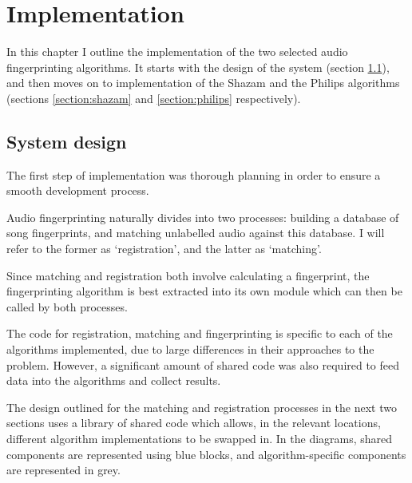 \documentclass[12pt,a4paper,twoside,openright]{report}
\begin{document}




\chapter{Implementation}
\label{implementation}

In this chapter I outline the implementation of the two selected audio fingerprinting algorithms. It starts with the design of the system (section \ref{section:systemdesign}), and then moves on to implementation of the Shazam and the Philips algorithms (sections \ref{section:shazam} and \ref{section:philips} respectively).


\section{System design}
\label{section:systemdesign}

The first step of implementation was thorough planning in order to ensure a smooth development process. 

Audio fingerprinting naturally divides into two processes: building a database of song fingerprints, and matching unlabelled audio against this database. I will refer to the former as `registration', and the latter as `matching'.

Since matching and registration both involve calculating a fingerprint, the fingerprinting algorithm is best extracted into its own module which can then be called by both processes.

The code for registration, matching and fingerprinting is specific to each of the algorithms implemented, due to large differences in their approaches to the problem. However, a significant amount of shared code was also required to feed data into the algorithms and collect results.

The design outlined for the matching and registration processes in the next two sections uses a library of shared code which allows, in the relevant locations, different algorithm implementations to be swapped in. In the diagrams, shared components are represented using blue blocks, and algorithm-specific components are represented in grey. 
\end{document}
